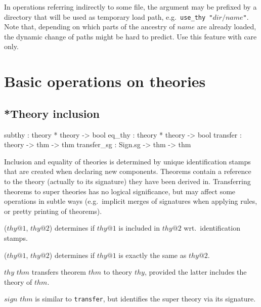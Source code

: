 In operations referring indirectly to some file, the argument may be prefixed
by a directory that will be used as temporary load path, e.g.\ 
\texttt{use_thy~"$dir/name$"}.  Note that, depending on which parts of the
ancestry of $name$ are already loaded, the dynamic change of paths might be
hard to predict.  Use this feature with care only.


\section{Basic operations on theories}\label{BasicOperationsOnTheories}

\subsection{*Theory inclusion}
\begin{ttbox}
subthy      : theory * theory -> bool
eq_thy      : theory * theory -> bool
transfer    : theory -> thm -> thm
transfer_sg : Sign.sg -> thm -> thm
\end{ttbox}

Inclusion and equality of theories is determined by unique
identification stamps that are created when declaring new components.
Theorems contain a reference to the theory (actually to its signature)
they have been derived in.  Transferring theorems to super theories
has no logical significance, but may affect some operations in subtle
ways (e.g.\ implicit merges of signatures when applying rules, or
pretty printing of theorems).

\begin{ttdescription}

\item[\ttindexbold{subthy} ($thy@1$, $thy@2$)] determines if $thy@1$
  is included in $thy@2$ wrt.\ identification stamps.

\item[\ttindexbold{eq_thy} ($thy@1$, $thy@2$)] determines if $thy@1$
  is exactly the same as $thy@2$.

\item[\ttindexbold{transfer} $thy$ $thm$] transfers theorem $thm$ to
  theory $thy$, provided the latter includes the theory of $thm$.
  
\item[\ttindexbold{transfer_sg} $sign$ $thm$] is similar to
  \texttt{transfer}, but identifies the super theory via its
  signature.

\end{ttdescription}


